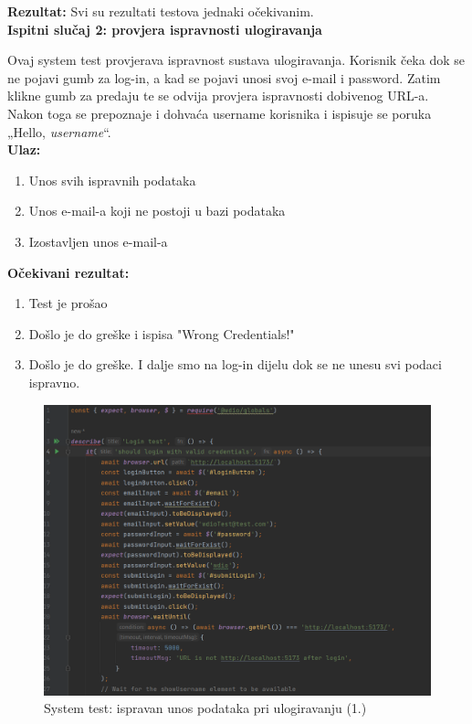 			\textbf{Rezultat:}
			Svi su rezultati testova jednaki očekivanim.\\
			
			\textbf{Ispitni slučaj 2: provjera ispravnosti ulogiravanja}
			
			Ovaj system test provjerava ispravnost sustava ulogiravanja. Korisnik čeka dok se ne pojavi gumb za log-in, a kad se pojavi unosi svoj e-mail i password. Zatim klikne gumb za predaju te se odvija provjera ispravnosti dobivenog URL-a. Nakon toga se prepoznaje i dohvaća username korisnika i ispisuje se poruka „Hello, \textit{username}“. \\
			
			\textbf{Ulaz:}
			
				\begin{enumerate}
					\item Unos svih ispravnih podataka
					\item Unos e-mail-a koji ne postoji u bazi podataka
					\item Izostavljen unos e-mail-a
				\end{enumerate}
				
			\textbf{Očekivani rezultat:}
			
				\begin{enumerate}
					\item Test je prošao
					\item Došlo je do greške i ispisa "Wrong Credentials!"
					\item Došlo je do greške. I dalje smo na log-in dijelu dok se ne unesu svi podaci ispravno.
				\end{enumerate}
			
			\begin{figure}[H]
				\includegraphics[scale=0.7]{slike/syslogin1.PNG} 
				\centering
				\caption{System test: ispravan unos podataka pri ulogiravanju (1.)}
				\label{syslogin1}
			\end{figure}
			
